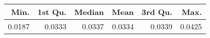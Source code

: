 \begin{table}[ht]
\centering
\begin{tabular}{rrrrrr}
  \hline
Min. & 1st Qu. & Median & Mean & 3rd Qu. & Max. \\ 
  \hline
0.0187 & 0.0333 & 0.0337 & 0.0334 & 0.0339 & 0.0425 \\ 
   \hline
\end{tabular}
\end{table}
